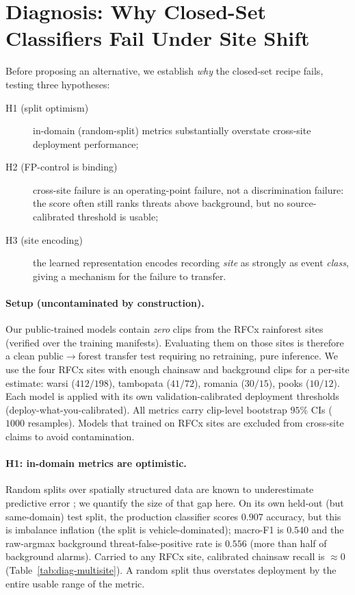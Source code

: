\section{Diagnosis: Why Closed-Set Classifiers Fail Under Site Shift}
\label{sec:diagnosis}

Before proposing an alternative, we establish \emph{why} the closed-set recipe
fails, testing three hypotheses:
\begin{description}
\item[H1 (split optimism)] in-domain (random-split) metrics substantially
      overstate cross-site deployment performance;
\item[H2 (FP-control is binding)] cross-site failure is an operating-point
      failure, not a discrimination failure: the score often still ranks
      threats above background, but no source-calibrated threshold is usable;
\item[H3 (site encoding)] the learned representation encodes recording
      \emph{site} as strongly as event \emph{class}, giving a mechanism for the
      failure to transfer.
\end{description}

\paragraph{Setup (uncontaminated by construction).} Our public-trained models
contain \emph{zero} clips from the RFCx rainforest sites (verified over the
training manifests). Evaluating them on those sites is therefore a clean
public$\rightarrow$forest transfer test requiring no retraining, pure
inference. We use the four RFCx sites with enough chainsaw and background clips
for a per-site estimate: warsi ($412/198$), tambopata ($41/72$), romania
($30/15$), pooks ($10/12$). Each model is applied with its own
validation-calibrated deployment thresholds (deploy-what-you-calibrated). All
metrics carry clip-level bootstrap $95\%$ CIs ($1000$ resamples). Models that
trained on RFCx sites are excluded from cross-site claims to avoid contamination.

\paragraph{H1: in-domain metrics are optimistic.} Random splits over spatially
structured data are known to underestimate predictive error
\citep{roberts2017crossval}; we quantify the size of that gap here. On its own held-out (but
same-domain) test split, the production classifier scores $0.907$ accuracy,
but this is imbalance inflation (the split is vehicle-dominated); macro-F1 is
$0.540$ and the raw-argmax background threat-false-positive rate is $0.556$
(more than half of background alarms). Carried to any RFCx site, calibrated
chainsaw recall is $\approx 0$ (Table~\ref{tab:diag-multisite}). A random split
thus overstates deployment by the entire usable range of the metric.

